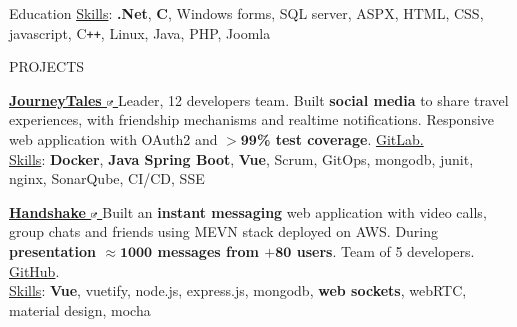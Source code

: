 \documentclass{cv} %
\def\intraexpvspace{0.15cm}
\begin{document}
\begin{rSection}{Education}
    \vspace*{-0.1cm}\hspace*{0.5cm}\underline{Skills}:
    \textbf{.Net},
    \textbf{C\text{\#}},
    Windows forms,
    SQL server,
    ASPX,
    HTML, CSS, javascript,
    C\texttt{++},
    Linux,
    Java,
    PHP,
    Joomla
\end{rSection}


\newpage
\begin{rSection}{PROJECTS}
    \vspace{-1.25em}
    \item \textbf{\href{https://pufferfish.sa4.usi.ch/login}
        {
            JourneyTales
            \includegraphics[width=0.15cm, trim={10cm -10cm 0cm 0cm}]{ext-link-icon.png}
        }}
    {Leader, 12 developers team.
        Built \textbf{social media} to share travel experiences,
        with friendship mechanisms and realtime notifications.
        Responsive web application with OAuth2 and $\boldsymbol{> 99}$\textbf{\% test coverage}.
        \href{https://gitlab.com/usi-si-oss/teaching/projects-showcase/sa4/team-4-pufferfish}{GitLab.}
    }\\[0.1cm]
    \hspace*{0.5cm}\underline{Skills}:
    \textbf{Docker},
    \textbf{Java Spring Boot},
    \textbf{Vue},
    Scrum,
    GitOps,
    mongodb,
    junit,
    nginx,
    SonarQube,
    CI/CD,
    SSE

    \vspace{\intraexpvspace}
    \item \textbf{\href{https://handshakeapp.ch}{
            Handshake
            \includegraphics[width=0.15cm, trim={10cm -10cm 0cm 0cm}]{ext-link-icon.png}
        }}
    {Built an \textbf{instant messaging} web application with video calls, group chats and friends
        using MEVN stack deployed on AWS.
        During \textbf{presentation $\boldsymbol{\approx1000}$ messages from $\boldsymbol{+80}$ users}.
        Team of 5 developers.
        \href{https://github.com/ogs-at-usi/handshake}{GitHub}.
    }\\[0.1cm]
    \hspace*{0.5cm}\underline{Skills}:
    \textbf{Vue},
    vuetify,
    node.js,
    express.js,
    mongodb,
    \textbf{web sockets},
    webRTC, %
    material design,
    mocha
\end{rSection}
\end{document}

